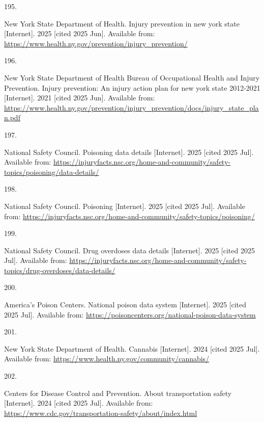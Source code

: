 \documentclass[
  english,
  letterpaper,
]{report}
\newlength{\cslhangindent}
\newlength{\csllabelwidth}
\newenvironment{CSLReferences}[2] %
 {\begin{list}{}{%
  \setlength{\itemindent}{0pt}
  \setlength{\leftmargin}{0pt}
  \setlength{\parsep}{0pt}
  \ifodd #1
   \setlength{\leftmargin}{\cslhangindent}
   \setlength{\itemindent}{-1\cslhangindent}
  \fi
  \setlength{\itemsep}{#2\baselineskip}}}
 {\end{list}}
\newcommand{\CSLLeftMargin}[1]{\parbox[t]{\csllabelwidth}{\strut#1\strut}}
\newcommand{\CSLRightInline}[1]{\parbox[t]{\linewidth - \csllabelwidth}{\strut#1\strut}}
\begin{document}
\begin{CSLReferences}{0}{1}
\CSLLeftMargin{195. }%
\CSLRightInline{New York State Department of Health. Injury prevention
in new york state {[}Internet{]}. 2025 {[}cited 2025 Jun{]}. Available
from: \url{https://www.health.ny.gov/prevention/injury_prevention/}}

\CSLLeftMargin{196. }%
\CSLRightInline{New York State Department of Health Bureau of
Occupational Health and Injury Prevention. Injury prevention: An injury
action plan for new york state 2012-2021 {[}Internet{]}. 2021 {[}cited
2025 Jun{]}. Available from:
\url{https://www.health.ny.gov/prevention/injury_prevention/docs/injury_state_plan.pdf}}

\CSLLeftMargin{197. }%
\CSLRightInline{National Safety Council. Poisoning data details
{[}Internet{]}. 2025 {[}cited 2025 Jul{]}. Available from:
\url{https://injuryfacts.nsc.org/home-and-community/safety-topics/poisoning/data-details/}}

\CSLLeftMargin{198. }%
\CSLRightInline{National Safety Council. Poisoning {[}Internet{]}. 2025
{[}cited 2025 Jul{]}. Available from:
\url{https://injuryfacts.nsc.org/home-and-community/safety-topics/poisoning/}}

\CSLLeftMargin{199. }%
\CSLRightInline{National Safety Council. Drug overdoses data details
{[}Internet{]}. 2025 {[}cited 2025 Jul{]}. Available from:
\url{https://injuryfacts.nsc.org/home-and-community/safety-topics/drug-overdoses/data-details/}}

\CSLLeftMargin{200. }%
\CSLRightInline{America's Poison Centers. National poison data system
{[}Internet{]}. 2025 {[}cited 2025 Jul{]}. Available from:
\url{https://poisoncenters.org/national-poison-data-system}}

\CSLLeftMargin{201. }%
\CSLRightInline{New York State Department of Health. Cannabis
{[}Internet{]}. 2024 {[}cited 2025 Jul{]}. Available from:
\url{https://www.health.ny.gov/community/cannabis/}}

\CSLLeftMargin{202. }%
\CSLRightInline{Centers for Disease Control and Prevention. About
transportation safety {[}Internet{]}. 2024 {[}cited 2025 Jul{]}.
Available from:
\url{https://www.cdc.gov/transportation-safety/about/index.html}}


\end{CSLReferences}
\end{document}
